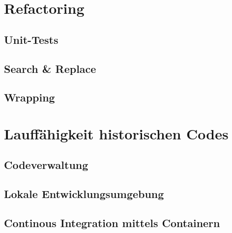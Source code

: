 \section{Refactoring}
    \subsection{Unit-Tests}
    \subsection{Search \& Replace}
    \subsection{Wrapping}

\section{Lauffähigkeit historischen Codes}
    \subsection{Codeverwaltung}
    \subsection{Lokale Entwicklungsumgebung}
    \subsection{Continous Integration mittels Containern}


